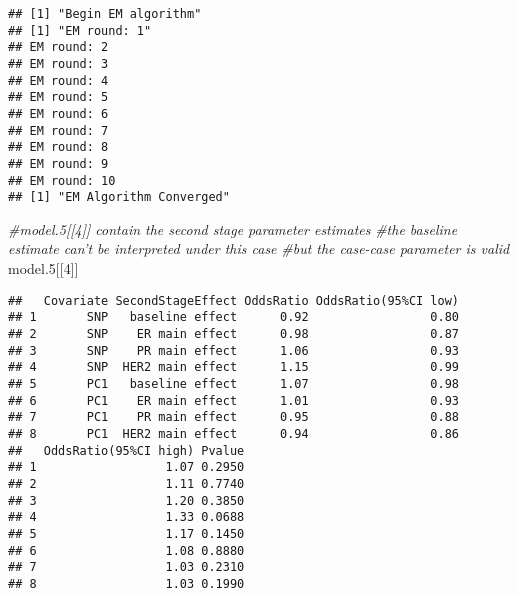 \documentclass[11pt,]{article}
\newenvironment{Shaded}{\begin{snugshade}}{\end{snugshade}}
\newcommand{\CommentTok}[1]{\textcolor[rgb]{0.56,0.35,0.01}{\textit{#1}}}
\newcommand{\DecValTok}[1]{\textcolor[rgb]{0.00,0.00,0.81}{#1}}
\newcommand{\FloatTok}[1]{\textcolor[rgb]{0.00,0.00,0.81}{#1}}
\newcommand{\NormalTok}[1]{#1}
\begin{document}
\begin{verbatim}
## [1] "Begin EM algorithm"
## [1] "EM round: 1"
## EM round: 2
## EM round: 3
## EM round: 4
## EM round: 5
## EM round: 6
## EM round: 7
## EM round: 8
## EM round: 9
## EM round: 10
## [1] "EM Algorithm Converged"
\end{verbatim}

\begin{Shaded}
\begin{Highlighting}[]
\CommentTok{#model.5[[4]] contain the second stage parameter estimates}
\CommentTok{#the baseline estimate can't be interpreted under this case}
\CommentTok{#but the case-case parameter is valid}
\NormalTok{model}\FloatTok{.5}\NormalTok{[[}\DecValTok{4}\NormalTok{]]}
\end{Highlighting}
\end{Shaded}

\begin{verbatim}
##   Covariate SecondStageEffect OddsRatio OddsRatio(95%CI low)
## 1       SNP   baseline effect      0.92                 0.80
## 2       SNP    ER main effect      0.98                 0.87
## 3       SNP    PR main effect      1.06                 0.93
## 4       SNP  HER2 main effect      1.15                 0.99
## 5       PC1   baseline effect      1.07                 0.98
## 6       PC1    ER main effect      1.01                 0.93
## 7       PC1    PR main effect      0.95                 0.88
## 8       PC1  HER2 main effect      0.94                 0.86
##   OddsRatio(95%CI high) Pvalue
## 1                  1.07 0.2950
## 2                  1.11 0.7740
## 3                  1.20 0.3850
## 4                  1.33 0.0688
## 5                  1.17 0.1450
## 6                  1.08 0.8880
## 7                  1.03 0.2310
## 8                  1.03 0.1990
\end{verbatim}
\end{document}

